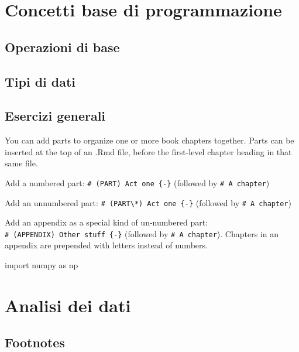 \documentclass[
]{book}
\newenvironment{Shaded}{\begin{snugshade}}{\end{snugshade}}
\newcommand{\ImportTok}[1]{#1}
\newcommand{\NormalTok}[1]{#1}
\theoremstyle{definition}
\theoremstyle{definition}
\theoremstyle{definition}
\theoremstyle{definition}
\theoremstyle{remark}
\begin{document}
\hypertarget{concetti-base-di-programmazione}{%
\chapter{Concetti base di programmazione}\label{concetti-base-di-programmazione}}

\hypertarget{operazioni-di-base}{%
\section{Operazioni di base}\label{operazioni-di-base}}

\hypertarget{tipi-di-dati}{%
\section{Tipi di dati}\label{tipi-di-dati}}

\hypertarget{esercizi-generali}{%
\section{Esercizi generali}\label{esercizi-generali}}

You can add parts to organize one or more book chapters together. Parts can be inserted at the top of an .Rmd file, before the first-level chapter heading in that same file.

Add a numbered part: \texttt{\#\ (PART)\ Act\ one\ \{-\}} (followed by \texttt{\#\ A\ chapter})

Add an unnumbered part: \texttt{\#\ (PART\textbackslash{}*)\ Act\ one\ \{-\}} (followed by \texttt{\#\ A\ chapter})

Add an appendix as a special kind of un-numbered part: \texttt{\#\ (APPENDIX)\ Other\ stuff\ \{-\}} (followed by \texttt{\#\ A\ chapter}). Chapters in an appendix are prepended with letters instead of numbers.

\begin{Shaded}
\begin{Highlighting}[]
\ImportTok{import}\NormalTok{ numpy }\ImportTok{as}\NormalTok{ np}
\end{Highlighting}
\end{Shaded}

\hypertarget{analisi-dei-dati}{%
\chapter{Analisi dei dati}\label{analisi-dei-dati}}

\hypertarget{footnotes}{%
\section{Footnotes}\label{footnotes}}
\end{document}
